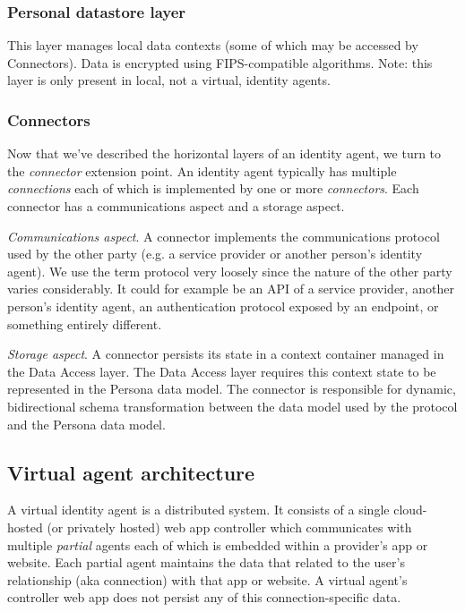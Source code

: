 \documentclass[11pt, oneside]{article}   	%
\begin{document}
\subsubsection{Personal datastore layer}

This layer manages local data contexts (some of which may be accessed by Connectors). Data is encrypted using FIPS-compatible algorithms. Note: this layer is only present in local, not a virtual, identity agents.

\subsubsection{Connectors}

Now that we've described the horizontal layers of an identity agent, we turn to the \emph{connector} extension point. An identity agent typically has multiple \emph{connections} each of which is implemented by one or more \emph{connectors}. Each connector has a communications aspect and a storage aspect.

\emph{Communications aspect}. A connector implements the communications protocol used by the other party (e.g. a service provider or another person's identity agent). We use the term protocol very loosely since the nature of the other party varies considerably. It could for example be an API of a service provider, another person's identity agent, an authentication protocol exposed by an endpoint, or something entirely different.

\emph{Storage aspect}. A connector persists its state in a context container managed in the Data Access layer. The Data Access layer requires this context state to be represented in the Persona data model. The connector is responsible for dynamic, bidirectional schema transformation between the data model used by the protocol and the Persona data model. 

\subsection{Virtual agent architecture}

A virtual identity agent is a distributed system. It consists of a single cloud-hosted (or privately hosted) web app controller which communicates with multiple \emph{partial} agents each of which is embedded within a provider's app or website. Each partial agent maintains the data that related to the user's relationship (aka connection) with that app or website. A virtual agent's controller web app does not persist any of this connection-specific data. 
\end{document}
